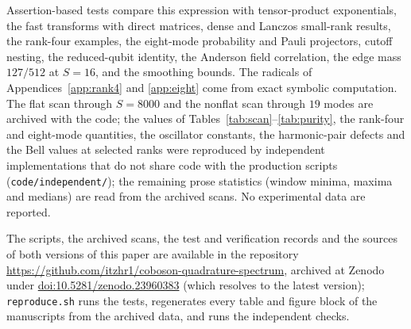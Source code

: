 \documentclass[11pt,a4paper]{article}
\begin{document}
Assertion-based tests compare this expression with tensor-product exponentials, the fast transforms with direct matrices, dense and Lanczos small-rank results, the rank-four examples, the eight-mode probability and Pauli projectors, cutoff nesting, the reduced-qubit identity, the Anderson field correlation, the edge mass $127/512$ at $S=16$, and the smoothing bounds. The radicals of Appendices~\ref{app:rank4} and \ref{app:eight} come from exact symbolic computation. The flat scan through $S=8000$ and the nonflat scan through $19$ modes are archived with the code; the values of Tables~\ref{tab:scan}--\ref{tab:purity}, the rank-four and eight-mode quantities, the oscillator constants, the harmonic-pair defects and the Bell values at selected ranks were reproduced by independent implementations that do not share code with the production scripts (\texttt{code/independent/}); the remaining prose statistics (window minima, maxima and medians) are read from the archived scans. No experimental data are reported.

The scripts, the archived scans, the test and verification records and the sources of both versions of this paper are available in the repository \url{https://github.com/itzhr1/coboson-quadrature-spectrum}, archived at Zenodo under \href{https://doi.org/10.5281/zenodo.23960383}{doi:10.5281/zenodo.23960383} (which resolves to the latest version); \texttt{reproduce.sh} runs the tests, regenerates every table and figure block of the manuscripts from the archived data, and runs the independent checks.
\end{document}
